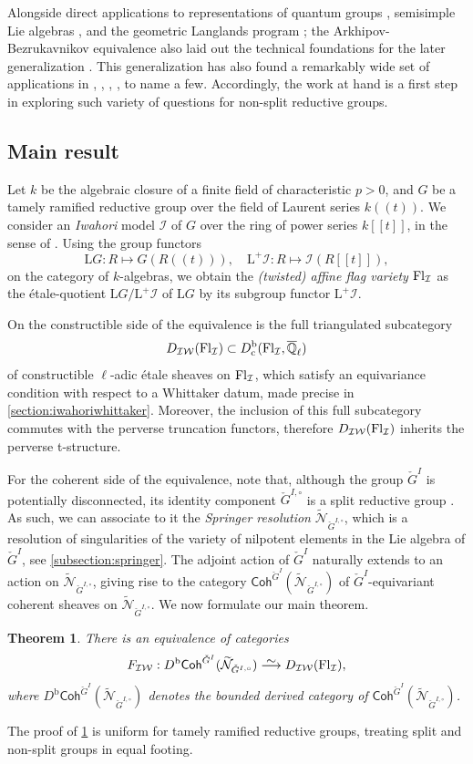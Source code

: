 \documentclass{amsart}
\newcommand{\Dbc}{D^{\mathrm{b}}_{\mathrm{c}}}
\newcommand{\Coh}{\mathsf{Coh}}
\newcommand{\Db}{D^{\mathrm{b}}}
\newcommand{\isomto}{\stackrel{\textstyle\sim}{\smash{\longrightarrow}\rule{0pt}{0.4ex}}}
\newcommand{\Qell}{\ensuremath{\overline{\mathbb{Q}}_\ell}}
\newcommand{\Lplus}{\mathrm{L}^+}
\newcommand{\LG}{\mathrm{L}G}
\newcommand{\I}{\mathcal{I}}
\newcommand{\IW}{\mathcal{IW}}
\newcommand{\DIW}{D_{\mathcal{IW}}(\Fl{\I})}
\newcommand{\Sprgd}{\widetilde{\mathcal{N}}_{\check{G}^{I,\circ}}}
\newcommand{\Gdual}{\check{G}^{I,\circ}}
\newcommand{\Fl}[2][]{%
  \ifblank{#1}{
    \operatorname{Fl}_{#2}}
  {
    \operatorname{Fl}_{#1,#2}}}
\numberwithin{equation}{section}
\newtheorem{thrm}{Theorem}[section]
\theoremstyle{definition}
\theoremstyle{remark}
\begin{document}
Alongside direct applications to representations of quantum groups
\cite{bezrukavnikovQuantum},
semisimple Lie algebras \cite{bezrukavnikovSemisimpleLie}, and the
geometric Langlands program \cite{frenkelGaitsgory}; the Arkhipov-Bezrukavnikov equivalence also laid out the technical foundations for the later
generalization \cite{bezrukavnikovEquivalence}. This generalization has also found a remarkably
wide set of applications in \cite{nadlerCategoricalDeligneLanglands}, \cite{yunNadlerBetti},
\cite{hellmannPadicEigenforms}, \cite{yunCommutingStack}, to name a few. Accordingly, the work
at hand is a first step in exploring
such variety of questions for non-split reductive groups.
\subsection{Main result}
Let $k$ be the algebraic closure of a finite field of characteristic $p>0$, and
$G$ be a tamely ramified reductive group over the field of Laurent series $k(\!(t)\!)$. We consider an
\textit{Iwahori} model $\I$ of $G$ over the ring of power series $k[\![t]\!]$, in the sense of \cite{bruhatTits}.
Using the group functors
$$\LG:R\mapsto G\left(R(\!(t)\!)\right), \quad \Lplus\I:
R\mapsto\I\left(R[\![t]\!]\right),$$
on the category of $k$-algebras, we obtain the \textit{(twisted) affine flag variety} $\Fl{\I}$ as the
\'etale-quotient $\LG/\Lplus\I$ of $\LG$ by its subgroup functor $\Lplus\I$.

On the constructible side of the equivalence is the full triangulated subcategory
$$\DIW\subset \Dbc(\Fl{\I},\Qell)$$
of constructible $\ell$-adic \'etale sheaves on $\Fl{\I}$, which satisfy an equivariance condition with
respect to a Whittaker datum, made precise in \cref{section:iwahoriwhittaker}. Moreover, the
inclusion of this full subcategory commutes with the perverse truncation functors,
therefore $\DIW$ inherits the perverse t-structure.

For the coherent side of the equivalence, note that, although the group $\check G^I$ is potentially disconnected,
its identity component $\Gdual$ is a split reductive group \cite[Proposition 16]{hainesSatake}.
As such, we can associate to it the \textit{Springer resolution} $\Sprgd$, which is a resolution
of singularities of the variety of nilpotent elements in the Lie algebra of $\check G^I$,
see \cref{subsection:springer}.
The adjoint action of $\check G^I$ naturally extends to an action on $\Sprgd$, giving rise to
the category $\Coh^{\check G^I}(\Sprgd)$ of $\check G^I$-equivariant coherent sheaves on
$\Sprgd$. We now formulate our main theorem.
\begin{thrm}\label{intro:mainthrm}
	There is an equivalence of categories
	$$F_\IW:\Db\Coh^{\check G^I}(\Sprgd)\isomto \DIW,$$
	where $\Db\Coh^{\check G^I}(\Sprgd)$ denotes the bounded derived category of $\Coh^{\check
	G^I}(\Sprgd)$.
\end{thrm}
The proof of \cref{intro:mainthrm} is uniform for tamely ramified reductive groups, treating
split and non-split groups in equal footing.
\end{document}
